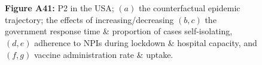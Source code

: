 \documentclass[paper=a4,fontsize=11pt]{article}
\begin{document}
\begin{figure}[!h]
  \\
  \hspace{1.76cm}
  \\
  \caption*{\textbf{Figure A41:} P2 in the USA; $(a)$ the counterfactual epidemic trajectory; the effects of increasing/decreasing $(b,c)$ the government response time \& proportion of cases self-isolating, $(d,e)$ adherence to NPIs during lockdown \& hospital capacity, and $(f,g)$ vaccine administration rate \& uptake.}
\end{figure}
\end{document}
